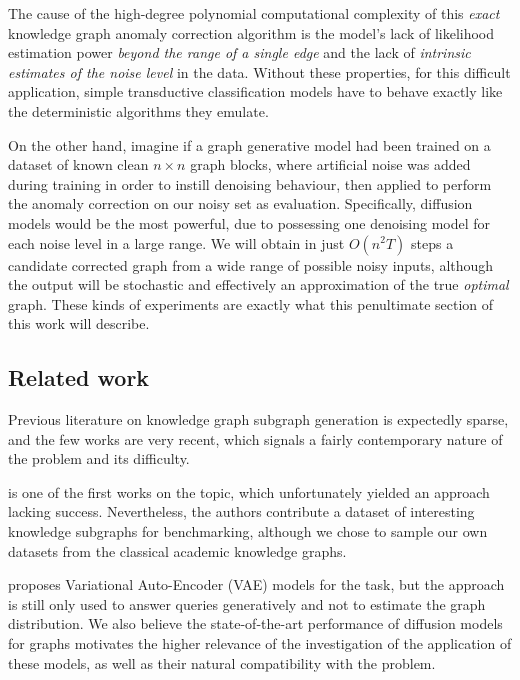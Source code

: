The cause of the high-degree polynomial computational complexity of this \emph{exact} knowledge graph anomaly correction algorithm is the model's lack of likelihood estimation power \emph{beyond the range of a single edge} and the lack of \emph{intrinsic estimates of the noise level} in the data. Without these properties, for this difficult application, simple transductive classification models have to behave exactly like the deterministic algorithms they emulate.

On the other hand, imagine if a graph generative model had been trained on a dataset of known clean $n \times n$ graph blocks, where artificial noise was added during training in order to instill denoising behaviour, then applied to perform the anomaly correction on our noisy set as evaluation. Specifically, diffusion models would be the most powerful, due to possessing one denoising model for each noise level in a large range. We will obtain in just $O(n^2 T)$ steps a candidate corrected graph from a wide range of possible noisy inputs, although the output will be stochastic and effectively an approximation of the true \emph{optimal} graph. These kinds of experiments are exactly what this penultimate section of this work will describe.

\subsection{Related work}

Previous literature on knowledge graph subgraph generation is expectedly sparse, and the few works are very recent, which signals a fairly contemporary nature of the problem and its difficulty. 

\cite{thanapalasingam_intelligraphs_2023} is one of the first works on the topic, which unfortunately yielded an approach lacking success. Nevertheless, the authors contribute a dataset of interesting knowledge subgraphs for benchmarking, although we chose to sample our own datasets from the classical academic knowledge graphs.

\cite{mahmoudzadeh_deep_2024} proposes Variational Auto-Encoder (VAE) models for the task, but the approach is still only used to answer queries generatively and not to estimate the graph distribution. We also believe the state-of-the-art performance of diffusion models for graphs motivates the higher relevance of the investigation of the application of these models, as well as their natural compatibility with the problem. 


